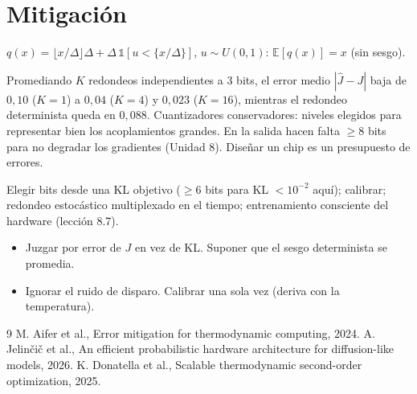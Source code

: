 \documentclass[11pt,a4paper]{article}
\begin{document}
\section{Mitigación}
\begin{definicion}
$q(x)=\lfloor x/\Delta\rfloor\Delta+\Delta\,\mathbb 1[u<\{x/\Delta\}]$, $u\sim U(0,1)$: $\mathbb E[q(x)]=x$ (sin sesgo).
\end{definicion}
Promediando $K$ redondeos independientes a 3 bits, el error medio $|\hat J-J|$ baja de $0{,}10$ ($K=1$) a $0{,}04$ ($K=4$) y $0{,}023$ ($K=16$), mientras el
redondeo determinista queda en $0{,}088$. Cuantizadores conservadores: niveles elegidos para representar bien los acoplamientos grandes. En la salida hacen
falta $\ge8$ bits para no degradar los gradientes (Unidad 8). Diseñar un chip es un presupuesto de errores.

\begin{aplicacion}
Elegir bits desde una KL objetivo ($\ge6$ bits para KL $<10^{-2}$ aquí); calibrar; redondeo estocástico multiplexado en el tiempo; entrenamiento consciente del
hardware (lección 8.7).
\end{aplicacion}

\begin{error}
\begin{itemize}[nosep]
\item Juzgar por error de $J$ en vez de KL. \quad Suponer que el sesgo determinista se promedia.
\item Ignorar el ruido de disparo. \quad Calibrar una sola vez (deriva con la temperatura).
\end{itemize}
\end{error}

\begin{thebibliography}{9}\small
{} M. Aifer et al., Error mitigation for thermodynamic computing, 2024.
 A. Jelinčič et al., An efficient probabilistic hardware architecture for diffusion-like models, 2026.
 K. Donatella et al., Scalable thermodynamic second-order optimization, 2025.
\end{thebibliography}
\end{document}
